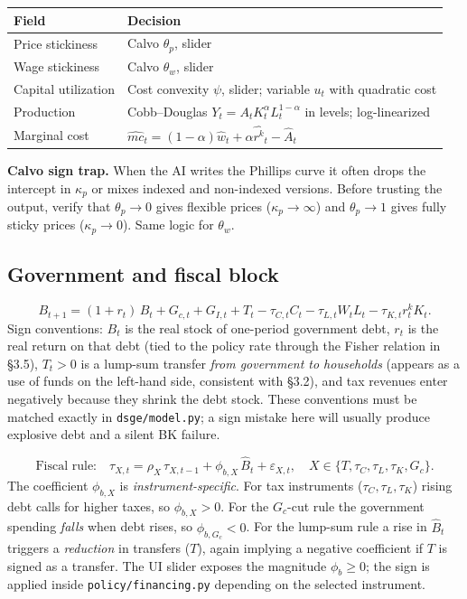 \documentclass[11pt]{article}
\begin{document}
\begin{tabularx}{\linewidth}{@{}p{3.1cm}X@{}}
\toprule
\textbf{Field} & \textbf{Decision} \\
\midrule
Price stickiness & Calvo $\theta_p$, slider \\
Wage stickiness & Calvo $\theta_w$, slider \\
Capital utilization & Cost convexity $\psi$, slider; variable $u_t$ with quadratic cost \\
Production & Cobb--Douglas $Y_t = A_t K_t^{\alpha} L_t^{1-\alpha}$ in levels; log-linearized \\
Marginal cost & $\widehat{mc}_t = (1-\alpha)\widehat{w}_t + \alpha \widehat{r^k}_t - \widehat{A}_t$ \\
\bottomrule
\end{tabularx}

\begin{warningbox}
\textbf{Calvo sign trap.} When the AI writes the Phillips curve it often drops the intercept in $\kappa_p$ or mixes indexed and non-indexed versions. Before trusting the output, verify that $\theta_p \to 0$ gives flexible prices ($\kappa_p \to \infty$) and $\theta_p \to 1$ gives fully sticky prices ($\kappa_p \to 0$). Same logic for $\theta_w$.
\end{warningbox}

\subsection{Government and fiscal block}
\[
B_{t+1} = (1+r_t)\, B_t + G_{c,t} + G_{I,t} + T_t - \tau_{C,t} C_t - \tau_{L,t} W_t L_t - \tau_{K,t} r^k_t K_t.
\]
Sign conventions: $B_t$ is the real stock of one-period government debt, $r_t$ is the real return on that debt (tied to the policy rate through the Fisher relation in \S3.5), $T_t>0$ is a lump-sum transfer \emph{from government to households} (appears as a use of funds on the left-hand side, consistent with \S3.2), and tax revenues enter negatively because they shrink the debt stock. These conventions must be matched exactly in \texttt{dsge/model.py}; a sign mistake here will usually produce explosive debt and a silent BK failure.

\[
\text{Fiscal rule:}\quad \tau_{X,t} = \rho_X\, \tau_{X,t-1} + \phi_{b,X}\, \hat B_t + \varepsilon_{X,t}, \quad X \in \{T,\tau_C,\tau_L,\tau_K,G_c\}.
\]
The coefficient $\phi_{b,X}$ is \emph{instrument-specific}. For tax instruments ($\tau_C, \tau_L, \tau_K$) rising debt calls for higher taxes, so $\phi_{b,X} > 0$. For the $G_c$-cut rule the government spending \emph{falls} when debt rises, so $\phi_{b,G_c} < 0$. For the lump-sum rule a rise in $\hat B_t$ triggers a \emph{reduction} in transfers ($T$), again implying a negative coefficient if $T$ is signed as a transfer. The UI slider exposes the magnitude $\phi_b \ge 0$; the sign is applied inside \texttt{policy/financing.py} depending on the selected instrument.
\end{document}
